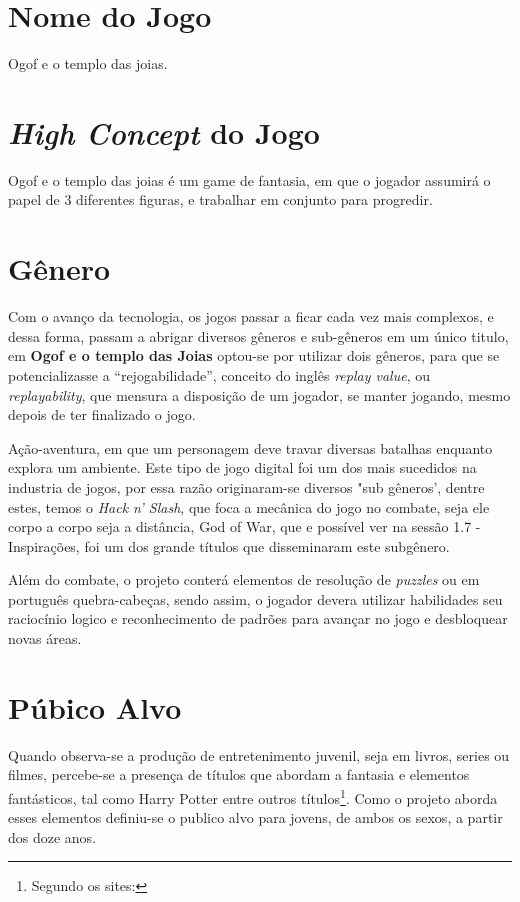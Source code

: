 \section{Nome do Jogo} Ogof e o templo das joias.

\section{\textit{High Concept} do Jogo} Ogof e o templo das joias é um game de
fantasia, em que o jogador assumirá o papel de 3 diferentes figuras, e trabalhar
em conjunto para progredir.

\section{Gênero}
Com o avanço da tecnologia, os jogos passar a ficar cada vez mais complexos, e dessa forma, passam a abrigar diversos gêneros e sub-gêneros em um único titulo, em \textbf{Ogof e o templo das Joias} optou-se por utilizar dois gêneros, para que se potencializasse a ``rejogabilidade'', conceito do inglês \textit{replay value}, ou \textit{replayability}, que mensura a disposição de um jogador, se manter jogando, mesmo depois de ter finalizado o jogo.\cite{novak}

Ação-aventura, em que um personagem deve travar diversas batalhas enquanto explora um ambiente. Este tipo de jogo digital foi um dos mais sucedidos na industria de jogos\cite{novak}, por essa razão originaram-se diversos "sub gêneros', dentre estes, temos o \textit{Hack n' Slash}, que foca a mecânica do jogo no combate, seja ele corpo a corpo seja a distância, God of War, que e possível ver na sessão 1.7 - Inspirações, foi um dos grande títulos que disseminaram este subgênero.

Além do combate, o projeto conterá elementos de resolução de \textit{puzzles} ou em português quebra-cabeças, sendo assim, o jogador devera utilizar habilidades seu raciocínio logico e reconhecimento de padrões para avançar no jogo e desbloquear novas áreas.

\section{Púbico Alvo}

Quando observa-se a produção de entretenimento juvenil, seja em livros, series ou filmes, percebe-se a presença de títulos que abordam a fantasia e elementos fantásticos, tal como Harry Potter entre outros títulos\footnote{Segundo os sites: }. Como o projeto aborda esses elementos definiu-se o publico alvo para jovens, de ambos os sexos, a partir dos doze anos.


